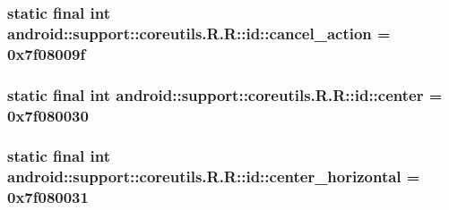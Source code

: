 \hypertarget{classandroid_1_1support_1_1coreutils_1_1_r_1_1id_35a2556685048641fe0b726bc444d21b}{
\subsubsection[{cancel\_\-action}]{\setlength{\rightskip}{0pt plus 5cm}static final int android::support::coreutils.R.R::id::cancel\_\-action = 0x7f08009f}}
\label{classandroid_1_1support_1_1coreutils_1_1_r_1_1id_35a2556685048641fe0b726bc444d21b}


\hypertarget{classandroid_1_1support_1_1coreutils_1_1_r_1_1id_01ae89a8bacfa7bc181bcb10e10d3734}{
\subsubsection[{center}]{\setlength{\rightskip}{0pt plus 5cm}static final int android::support::coreutils.R.R::id::center = 0x7f080030}}
\label{classandroid_1_1support_1_1coreutils_1_1_r_1_1id_01ae89a8bacfa7bc181bcb10e10d3734}


\hypertarget{classandroid_1_1support_1_1coreutils_1_1_r_1_1id_4a0fec27e87e83b59cf6d60b6d17654b}{
\subsubsection[{center\_\-horizontal}]{\setlength{\rightskip}{0pt plus 5cm}static final int android::support::coreutils.R.R::id::center\_\-horizontal = 0x7f080031}}
\label{classandroid_1_1support_1_1coreutils_1_1_r_1_1id_4a0fec27e87e83b59cf6d60b6d17654b}


